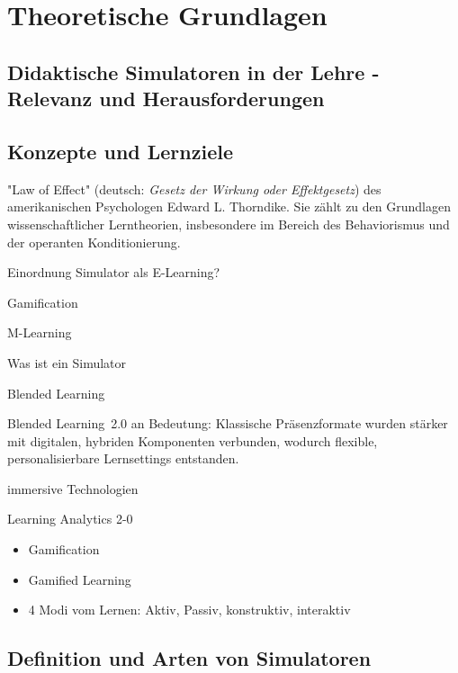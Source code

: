 \chapter{Theoretische Grundlagen}

\section{Didaktische Simulatoren in der Lehre - Relevanz und Herausforderungen}

\section{Konzepte und Lernziele}


"Law of Effect" (deutsch: \textit{Gesetz der Wirkung oder Effektgesetz}) des amerikanischen Psychologen Edward L. Thorndike. Sie zählt zu den Grundlagen wissenschaftlicher Lerntheorien, insbesondere im Bereich des Behaviorismus und der operanten Konditionierung.

Einordnung Simulator als E-Learning?

Gamification

M-Learning

Was ist ein Simulator

Blended Learning

Blended Learning~2.0 an Bedeutung: Klassische Präsenzformate wurden stärker mit digitalen, hybriden Komponenten verbunden, wodurch flexible, personalisierbare Lernsettings entstanden.\parencite{bonk2020}

immersive Technologien

Learning Analytics 2-0

\begin{itemize}
    \item Gamification
    \item Gamified Learning
    \item 4 Modi vom Lernen: Aktiv, Passiv, konstruktiv, interaktiv
\end{itemize}

\section{Definition und Arten von Simulatoren}
